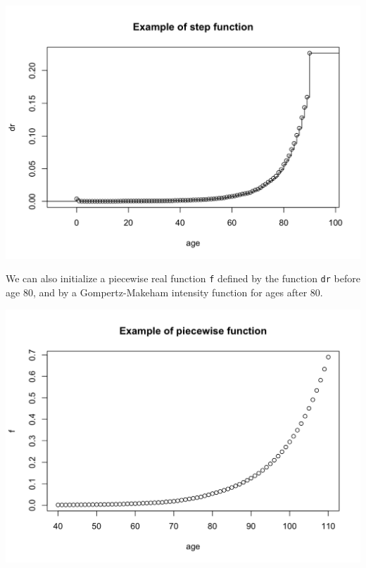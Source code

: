 \begin{center}\includegraphics{figure/plot_stepfun-1} \end{center}

We can also initialize a piecewise real function \texttt{f} defined by the function \texttt{dr} before age 80, and by a Gompertz-Makeham intensity function for ages after 80.

\begin{Shaded}
\begin{Highlighting}[]
\StringTok{ }\NormalTok{(}\NormalTok{, }\NormalTok{(}\NormalTok{, }\NormalTok{)))}
\StringTok{ }\NormalTok{(}\NormalTok{, }\NormalTok{)}
\NormalTok{, }\NormalTok{, }\NormalTok{)}
\end{Highlighting}
\end{Shaded}

\begin{center}\includegraphics{figure/plot_piecewise-1} \end{center}


